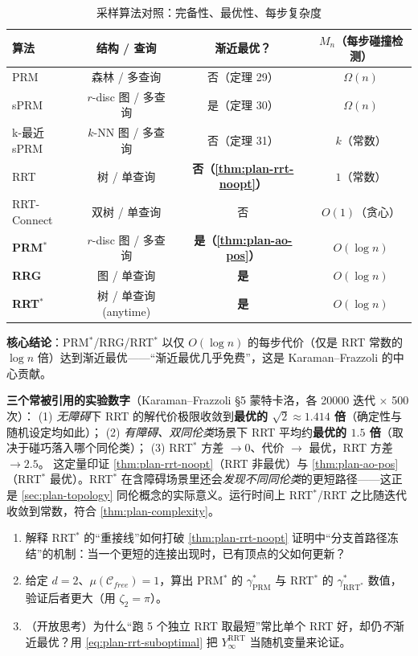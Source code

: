 \begin{table}[H]\centering\small
\caption{采样算法对照：完备性、最优性、每步复杂度}
\label{tab:plan-algos}
\begin{tabular}{lccc}
\toprule
算法 & 结构 / 查询 & 渐近最优？ & $M_n$（每步碰撞检测） \\
\midrule
PRM & 森林 / 多查询 & 否（定理 29） & $\Omega(n)$ \\
sPRM & $r$-disc 图 / 多查询 & 是（定理 30） & $\Omega(n)$ \\
k-最近 sPRM & $k$-NN 图 / 多查询 & 否（定理 31） & $k$（常数） \\
RRT & 树 / 单查询 & \textbf{否（\cref{thm:plan-rrt-noopt}）} & $1$（常数） \\
RRT-Connect & 双树 / 单查询 & 否 & $O(1)$（贪心） \\
\textbf{PRM$^*$} & $r$-disc 图 / 多查询 & \textbf{是（\cref{thm:plan-ao-pos}）} & $O(\log n)$ \\
\textbf{RRG} & 图 / 单查询 & \textbf{是} & $O(\log n)$ \\
\textbf{RRT$^*$} & 树 / 单查询(anytime) & \textbf{是} & $O(\log n)$ \\
\bottomrule
\end{tabular}
\end{table}

\noindent\textbf{核心结论}：PRM$^*$/RRG/RRT$^*$ 以仅 $O(\log n)$ 的每步代价（仅是 RRT 常数的 $\log n$ 倍）达到渐近最优——“渐近最优几乎免费”，这是 Karaman--Frazzoli 的中心贡献。

\begin{insight}
\textbf{三个常被引用的实验数字}（Karaman--Frazzoli\cite{karaman2011sampling} §5 蒙特卡洛，各 20000 迭代 $\times$ 500 次）：
(1) \emph{无障碍}下 RRT 的解代价极限收敛到\textbf{最优的 $\sqrt2\approx1.414$ 倍}（确定性与随机设定均如此）；
(2) \emph{有障碍、双同伦类}场景下 RRT 平均约\textbf{最优的 $1.5$ 倍}（取决于碰巧落入哪个同伦类）；
(3) RRT$^*$ 方差 $\to0$、代价 $\to$ 最优，RRT 方差 $\to2.5$。
这定量印证 \cref{thm:plan-rrt-noopt}（RRT 非最优）与 \cref{thm:plan-ao-pos}（RRT$^*$ 最优）。RRT$^*$ 在含障碍场景里还会\emph{发现不同同伦类}的更短路径——这正是 \cref{sec:plan-topology} 同伦概念的实际意义。运行时间上 RRT$^*$/RRT 之比随迭代收敛到常数，符合 \cref{thm:plan-complexity}。
\end{insight}

\begin{practice}
\begin{enumerate}
  \item 解释 RRT$^*$ 的“重接线”如何打破 \cref{thm:plan-rrt-noopt} 证明中“分支首路径冻结”的机制：当一个更短的连接出现时，已有顶点的父如何更新？
  \item 给定 $d=2$、$\mu(\mathcal{C}_{free})=1$，算出 PRM$^*$ 的 $\gamma_{\mathrm{PRM}}^*$ 与 RRT$^*$ 的 $\gamma_{\mathrm{RRT}^*}^*$ 数值，验证后者更大（用 $\zeta_2=\pi$）。
  \item （开放思考）为什么“跑 5 个独立 RRT 取最短”常比单个 RRT 好，却仍\emph{不}渐近最优？用 \cref{eq:plan-rrt-suboptimal} 把 $Y_\infty^{\mathrm{RRT}}$ 当随机变量来论证。
\end{enumerate}
\end{practice}

